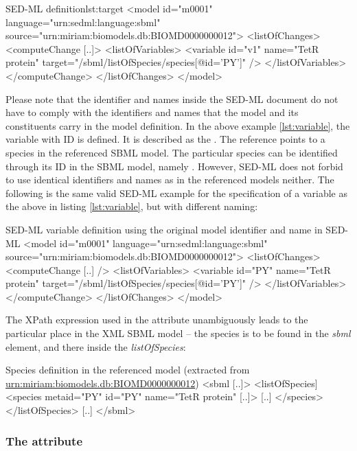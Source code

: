 %
\begin{myXmlLst}{SED-ML  definition}{lst:target}
<model id="m0001" language="urn:sedml:language:sbml" 
 source="urn:miriam:biomodels.db:BIOMD0000000012">
 <listOfChanges>
  <computeChange [..]>
   <listOfVariables>
    <variable id="v1" name="TetR protein" target="/sbml/listOfSpecies/species[@id='PY']" />
   </listOfVariables>
  </computeChange>
 </listOfChanges>
</model>
\end{myXmlLst}
%
Please note that the identifier and names inside the SED-ML document do not have to comply with the identifiers and names that the model and its constituents carry in the model definition. In the above example \ref{lst:variable}, the variable with ID  is defined. It is described as the . The reference points to a species in the referenced SBML model. The particular species can be identified through its ID in the SBML model, namely . However, SED-ML does not forbid to use identical identifiers and names as in the referenced models neither. The following is the same valid SED-ML example for the specification of a variable as the above in listing \ref{lst:variable}, but with different naming:
%
\begin{myXmlLst}{SED-ML variable definition using the original model identifier and name in SED-ML}{}
<model id="m0001" language="urn:sedml:language:sbml" 
 source="urn:miriam:biomodels.db:BIOMD0000000012">
 <listOfChanges>
  <computeChange [..] />
   <listOfVariables>
    <variable id="PY" name="TetR protein" target="/sbml/listOfSpecies/species[@id='PY']" />
   </listOfVariables>
  </computeChange>
 </listOfChanges>
</model>
\end{myXmlLst}
%

The XPath expression used in the  attribute unambiguously leads to the particular place in the XML SBML model -- the species is to be found in the \emph{sbml} element, and there inside the \emph{listOfSpecies}:
%
\begin{myXmlLst}{Species definition in the referenced model (extracted from \url{urn:miriam:biomodels.db:BIOMD0000000012})}{}
<sbml [..]>
 <listOfSpecies]
  <species metaid="PY" id="PY" name="TetR protein" [..]>
   [..]
  </species>
 </listOfSpecies>
 [..]
</sbml>
\end{myXmlLst}
%

\subsubsection{The  attribute}
\label{sec:symbol}

